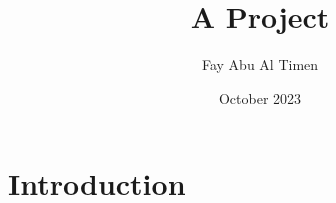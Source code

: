 \documentclass{article}
\title{A Project}
\author{Fay Abu Al Timen}
\date{October 2023}
\begin{document}
\maketitle

\section{Introduction}
\end{document}
